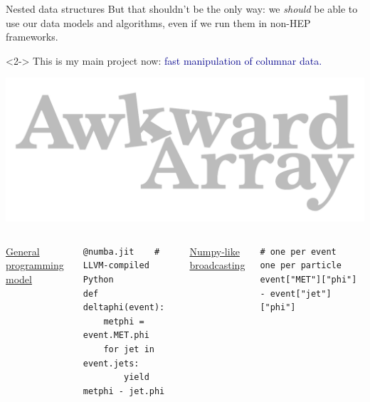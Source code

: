 \documentclass[aspectratio=169]{beamer}
\begin{document}
\begin{frame}[fragile]{Nested data structures}
\large
\vspace{0.4 cm}
But that shouldn't be the only way: we {\it should} be able to use our data models and algorithms, even if we run them in non-HEP frameworks.

\begin{uncoverenv}<2->
\vspace{0.5 cm}
This is my main project now: \textcolor{darkblue}{fast manipulation of columnar data.}

\vspace{0.25 cm}
\hfill \includegraphics[height=1 cm]{awkward-logo.pdf}

\vspace{0.25 cm}
\vspace{-1 cm}
\scriptsize
\begin{columns}[t]
\underline{\large General programming model}

\begin{verbatim}
@numba.jit    # LLVM-compiled Python
def deltaphi(event):
    metphi = event.MET.phi
    for jet in event.jets:
        yield metphi - jet.phi
\end{verbatim}

\underline{\large Numpy-like broadcasting}

\vspace{\baselineskip}
\begin{verbatim}
# one per event       one per particle
event["MET"]["phi"] - event["jet"]["phi"]
\end{verbatim}
\end{columns}
\end{uncoverenv}

\large
\vspace{0.7 cm}
\end{frame}
\end{document}
